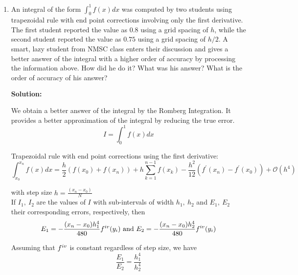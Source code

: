 \documentclass[a4paper,11pt]{report}
\begin{document}
\doublespacing
\begin{enumerate}

    \item An integral of the form $\displaystyle \int_{0}^{1} f(x) dx$ was computed
    by two students using trapezoidal rule with end point corrections involving only
    the first derivative. The first student reported the value as $0.8$ using a grid
    spacing of $h$, while the second student reported the value as $0.75$ using a grid
    spacing of $h/2$. A smart, lazy student from NMSC class enters their discussion
    and gives a better answer of the integral with a higher order of accuracy by processing
    the information above. How did he do it? What was his answer? What is the order of
    accuracy of his answer?

    \textbf{Solution:}
    
    We obtain a better answer of the integral by the Romberg Integration. It provides a better approximation of the integral by reducing the true error.
    \begin{equation*}
    I = \int_{0}^{1} f(x) dx
    \end{equation*}    

    Trapezoidal rule with end point corrections using the first derivative:
    \begin{equation*}
    \int_{x_{0}}^{x_{n}} f(x) dx = \frac{h}{2} \left( f(x_{0}) + f(x_{n}) \right) + h \sum_{k=1}^{n-1} f(x_{k}) - \frac{h^{2}}{12} \left( f^{\prime}(x_{n}) - f^{\prime}(x_{0}) \right) + \mathcal{O}(h^{4})
    \end{equation*} 
    
    with step size $h = \displaystyle \frac{(x_{n} - x_{0})}{N}$ \\
    
    If $I_{1},\ I_{2}$ are the values of $I$ with sub-intervals of width $h_{1},\ h_{2}$ and $E_{1},\ E_{2}$ their corresponding errors, respectively, then
    \begin{equation*}
    E_{1} = - \frac{(x_{n} - x_{0})h_{1}^{4}}{480} f^{\romannumeral 4} (y_{i}) \ \text{and} \ E_{2} = - \frac{(x_{n} - x_{0})h_{2}^{4}}{480} f^{\romannumeral 4} (y_{i})
    \end{equation*}

    Assuming that $f^{\romannumeral 4}$ is constant regardless of step size, we have
    \begin{equation*}
    \frac{E_{1}}{E_{2}} = \frac{h_{1}^4}{h_{2}^4}
    \end{equation*}


\end{enumerate}
\end{document}

